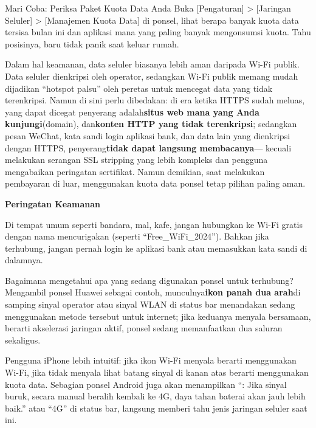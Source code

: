 \begin{tcbpractice}{Mari Coba: Periksa Paket Kuota Data Anda}
Buka [Pengaturan] > [Jaringan Seluler] > [Manajemen Kuota Data] di ponsel, lihat berapa banyak kuota data tersisa bulan ini dan aplikasi mana yang paling banyak mengonsumsi kuota. Tahu posisinya, baru tidak panik saat keluar rumah.

\end{tcbpractice}


Dalam hal keamanan, data seluler biasanya lebih aman daripada Wi-Fi publik. Data seluler dienkripsi oleh operator, sedangkan Wi-Fi publik memang mudah dijadikan “hotspot palsu” oleh peretas untuk mencegat data yang tidak terenkripsi. Namun di sini perlu dibedakan: di era ketika HTTPS sudah meluas, yang dapat dicegat penyerang adalah\textbf{situs web mana yang Anda kunjungi}(domain), dan\textbf{konten HTTP yang tidak terenkripsi}; sedangkan pesan WeChat, kata sandi login aplikasi bank, dan data lain yang dienkripsi dengan HTTPS, penyerang\textbf{tidak dapat langsung membacanya}— kecuali melakukan serangan SSL stripping yang lebih kompleks dan pengguna mengabaikan peringatan sertifikat. Namun demikian, saat melakukan pembayaran di luar, menggunakan kuota data ponsel tetap pilihan paling aman.

\textbf{Peringatan Keamanan}\par

Di tempat umum seperti bandara, mal, kafe, jangan hubungkan ke Wi-Fi gratis dengan nama mencurigakan (seperti “Free\_WiFi\_2024”). Bahkan jika terhubung, jangan pernah login ke aplikasi bank atau memasukkan kata sandi di dalamnya.


Bagaimana mengetahui apa yang sedang digunakan ponsel untuk terhubung? Mengambil ponsel Huawei sebagai contoh, munculnya\textbf{ikon panah dua arah}di samping sinyal operator atau sinyal WLAN di status bar menandakan sedang menggunakan metode tersebut untuk internet; jika keduanya menyala bersamaan, berarti akselerasi jaringan aktif, ponsel sedang memanfaatkan dua saluran sekaligus.

Pengguna iPhone lebih intuitif: jika ikon Wi-Fi menyala berarti menggunakan Wi-Fi, jika tidak menyala lihat batang sinyal di kanan atas berarti menggunakan kuota data. Sebagian ponsel Android juga akan menampilkan “: Jika sinyal buruk, secara manual beralih kembali ke 4G, daya tahan baterai akan jauh lebih baik.” atau “4G” di status bar, langsung memberi tahu jenis jaringan seluler saat ini.


